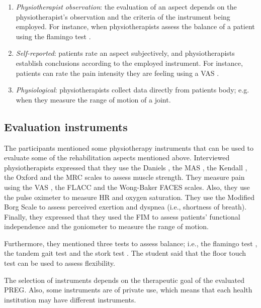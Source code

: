 \begin{enumerate}
  \item \emph{Physiotherapist observation}: the evaluation of an aspect depends on the physiotherapist's observation and the criteria of the instrument being employed. For instance, when physiotherapists assess the balance of a patient using the flamingo test \autocite{flamingo}. 
  \item \emph{Self-reported}: patients rate an aspect subjectively, and physiotherapists establish conclusions according to the employed instrument. For instance, patients can rate the pain intensity they are feeling using a \ac{VAS} \autocite{vasScale}.
 \item \emph{Physiological}: physiotherapists collect data directly from patients body; e.g. when they measure the range of motion of a joint.
\end{enumerate}

\subsection{Evaluation instruments}
\label{sec:rehab_instruments}
The participants mentioned some physiotherapy instruments that can be used to evaluate some of the rehabilitation aspects mentioned above. Interviewed physiotherapists expressed that they use the Daniels \autocite{danielsScale}, the \ac{MAS} \autocite{ashwortScale}, the Kendall \autocite{kendallScale}, the Oxford \autocite{oxfordScale} and the \ac{MRC} \autocite{mrcScale} scales to assess muscle strength. They measure pain using the \ac{VAS} \autocite{vasScale}, the \ac{FLACC} \autocite{flaccScale} and the Wong-Baker FACES \autocite{Baker} scales. Also, they use the pulse oximeter to measure \ac{HR} and oxygen saturation. They use the Modified Borg Scale \autocite{modifiedBorgScale_2014} to assess perceived exertion and dyspnea (i.e., shortness of breath). Finally, they expressed that they used the \ac{FIM} \autocite{fim} to assess patients' functional independence and the goniometer \autocite{goniometry} to measure the range of motion. 

Furthermore, they mentioned three tests to assess balance; i.e., the flamingo test \autocite{flamingo}, the tandem gait test \autocite{tandemGaitTest} and the stork test \autocite{storkTest}. The student said that the floor touch test \autocite{floorTouch} can be used to assess flexibility. 

The selection of instruments depends on the therapeutic goal of the evaluated \ac{PREG}. Also, some instruments are of private use, which means that each health institution may have different instruments.

